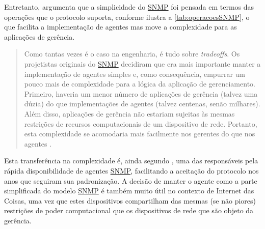 \documentclass[twoside,english,brazilian]{UNISINOSmonografia}
\begin{document}
Entretanto,  argumenta que a simplicidade do \hyperref[siglas]{SNMP} foi 
pensada em termos das operações que o protocolo suporta, conforme ilustra a 
\autoref{tab:operacoesSNMP}, o que facilita a implementação de agentes mas 
move a complexidade para as aplicações de gerência.

\begin{quote}
Como tantas vezes é o caso na engenharia, é tudo sobre \textit{tradeoffs}.
Os projetistas originais do \hyperref[siglas]{SNMP} decidiram que era mais importante manter a 
implementação de agentes simples e, como consequência, empurrar um pouco mais 
de complexidade para a lógica da aplicação de gerenciamento.
Primeiro, haveria um menor número de aplicações de gerência (talvez uma dúzia) 
do que implementações de agentes (talvez centenas, senão milhares).
Além disso, aplicações de gerência não estariam sujeitas às mesmas restrições 
de recursos computacionais de um dispositivo de rede.
Portanto, esta complexidade se acomodaria mais facilmente nos gerentes do que 
nos agentes
\cite[p.~250]{Clemm2006}.
\end{quote}

Esta transferência na complexidade é, ainda segundo , uma 
das responsáveis pela rápida disponibilidade de agentes \hyperref[siglas]{SNMP}, facilitando a 
aceitação do protocolo nos anos que seguiram sua padronização.
A decisão de manter o agente como a parte simplificada do modelo \hyperref[siglas]{SNMP} é também 
muito útil no contexto de Internet das Coisas, uma vez que estes dispositivos 
compartilham das mesmas (se não piores) restrições de poder computacional que 
os dispositivos de rede que são objeto da gerência.
\end{document}
